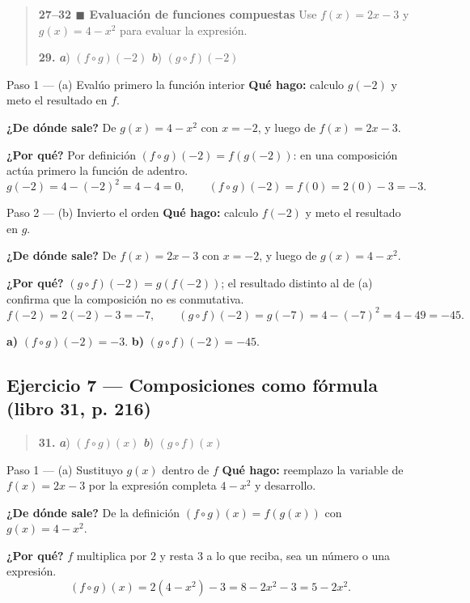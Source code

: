 \documentclass[11pt]{article}
\begin{document}
\begin{quote}
\textbf{27--32 $\blacksquare$ Evaluación de funciones compuestas} \quad Use $f(x)=2x-3$ y $g(x)=4-x^2$ para evaluar la expresión.

\textbf{29.} \; \textbf{\emph{a}}) $(f\circ g)(-2)$ \hfill \textbf{\emph{b}}) $(g\circ f)(-2)$
\end{quote}

\begin{paso}{Paso 1 --- (a) Evalúo primero la función interior}
\textbf{Qué hago:} calculo $g(-2)$ y meto el resultado en $f$.

\textbf{¿De dónde sale?} De $g(x)=4-x^2$ con $x=-2$, y luego de $f(x)=2x-3$.

\textbf{¿Por qué?} Por definición $(f\circ g)(-2)=f(g(-2))$: en una composición actúa primero la función de adentro.
\[
g(-2)=4-(-2)^2=4-4=0,\qquad (f\circ g)(-2)=f(0)=2(0)-3=-3 .
\]
\end{paso}

\begin{paso}{Paso 2 --- (b) Invierto el orden}
\textbf{Qué hago:} calculo $f(-2)$ y meto el resultado en $g$.

\textbf{¿De dónde sale?} De $f(x)=2x-3$ con $x=-2$, y luego de $g(x)=4-x^2$.

\textbf{¿Por qué?} $(g\circ f)(-2)=g(f(-2))$; el resultado distinto al de (a) confirma que la composición no es conmutativa.
\[
f(-2)=2(-2)-3=-7,\qquad (g\circ f)(-2)=g(-7)=4-(-7)^2=4-49=-45 .
\]
\end{paso}

\begin{resp}
\textbf{a)} $(f\circ g)(-2)=-3$. \qquad \textbf{b)} $(g\circ f)(-2)=-45$.
\end{resp}

\subsection*{Ejercicio 7 — Composiciones como fórmula (libro 31, p. 216)}

\begin{quote}
\textbf{31.} \; \textbf{\emph{a}}) $(f\circ g)(x)$ \hfill \textbf{\emph{b}}) $(g\circ f)(x)$

\end{quote}

\begin{paso}{Paso 1 --- (a) Sustituyo $g(x)$ dentro de $f$}
\textbf{Qué hago:} reemplazo la variable de $f(x)=2x-3$ por la expresión completa $4-x^2$ y desarrollo.

\textbf{¿De dónde sale?} De la definición $(f\circ g)(x)=f(g(x))$ con $g(x)=4-x^2$.

\textbf{¿Por qué?} $f$ multiplica por $2$ y resta $3$ a lo que reciba, sea un número o una expresión.
\[
(f\circ g)(x)=2(4-x^2)-3=8-2x^2-3=5-2x^2 .
\]
\end{paso}
\end{document}
